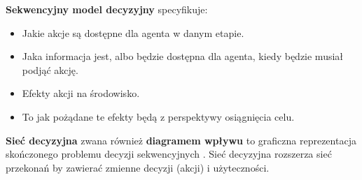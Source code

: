 \documentclass[a4paper, 12pt,twoside]{report}
\begin{document}
\textbf{Sekwencyjny model decyzyjny} specyfikuje:
\begin{itemize}
	\setlength\itemsep{-0.4em}
	\item Jakie akcje są dostępne dla agenta w danym etapie.
	\item Jaka informacja jest, albo będzie dostępna dla agenta, kiedy
		będzie musiał podjąć akcję.
	\item Efekty akcji na środowisko.
	\item To jak pożądane te efekty będą z perspektywy osiągnięcia celu.
\end{itemize}

\textbf{Sieć decyzyjna} zwana również \textbf{diagramem wpływu} to graficzna
reprezentacja skończonego problemu decyzji
sekwencyjnych \cite{ai_foundations_decision_networks}. Sieć decyzyjna
rozszerza sieć przekonań by zawierać zmienne decyzji (akcji) i użyteczności.
\end{document}
